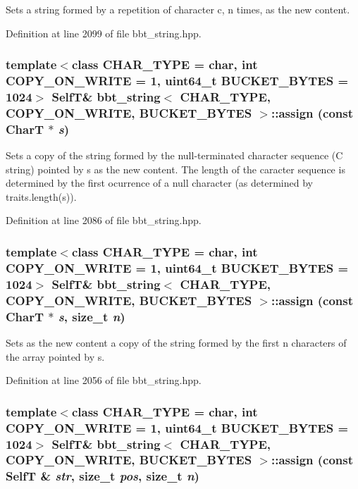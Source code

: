 Sets a string formed by a repetition of character c, n times, as the new content. 

Definition at line 2099 of file bbt\_\-string.hpp.\hypertarget{classbbt__string_aff6d129e3e7ce9472f4e1a152f8d5fd}{
\subsubsection[{assign}]{\setlength{\rightskip}{0pt plus 5cm}template$<$class CHAR\_\-TYPE  = char, int COPY\_\-ON\_\-WRITE = 1, uint64\_\-t BUCKET\_\-BYTES = 1024$>$ {\bf SelfT}\& {\bf bbt\_\-string}$<$ CHAR\_\-TYPE, COPY\_\-ON\_\-WRITE, BUCKET\_\-BYTES $>$::assign (const CharT $\ast$ {\em s})}}
\label{classbbt__string_aff6d129e3e7ce9472f4e1a152f8d5fd}


Sets a copy of the string formed by the null-terminated character sequence (C string) pointed by s as the new content. The length of the caracter sequence is determined by the first ocurrence of a null character (as determined by traits.length(s)). 

Definition at line 2086 of file bbt\_\-string.hpp.\hypertarget{classbbt__string_2f40712bf2f31915bfad61172f224827}{
\subsubsection[{assign}]{\setlength{\rightskip}{0pt plus 5cm}template$<$class CHAR\_\-TYPE  = char, int COPY\_\-ON\_\-WRITE = 1, uint64\_\-t BUCKET\_\-BYTES = 1024$>$ {\bf SelfT}\& {\bf bbt\_\-string}$<$ CHAR\_\-TYPE, COPY\_\-ON\_\-WRITE, BUCKET\_\-BYTES $>$::assign (const CharT $\ast$ {\em s}, \/  size\_\-t {\em n})}}
\label{classbbt__string_2f40712bf2f31915bfad61172f224827}


Sets as the new content a copy of the string formed by the first n characters of the array pointed by s. 

Definition at line 2056 of file bbt\_\-string.hpp.\hypertarget{classbbt__string_9fa5926de65736614641d94c9cba83bf}{
\subsubsection[{assign}]{\setlength{\rightskip}{0pt plus 5cm}template$<$class CHAR\_\-TYPE  = char, int COPY\_\-ON\_\-WRITE = 1, uint64\_\-t BUCKET\_\-BYTES = 1024$>$ {\bf SelfT}\& {\bf bbt\_\-string}$<$ CHAR\_\-TYPE, COPY\_\-ON\_\-WRITE, BUCKET\_\-BYTES $>$::assign (const {\bf SelfT} \& {\em str}, \/  size\_\-t {\em pos}, \/  size\_\-t {\em n})}}
\label{classbbt__string_9fa5926de65736614641d94c9cba83bf}


